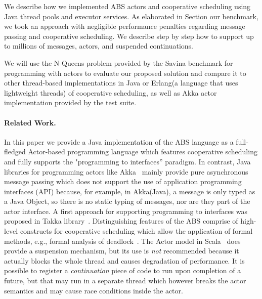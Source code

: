 We describe how we implemented ABS actors and cooperative scheduling using Java thread pools and executor services. 
As elaborated in Section our benchmark, we took an approach with negligible performance penalties regarding message passing and cooperative scheduling. 
We describe step by step how to support up to millions of messages, actors, and suspended continuations.


We will use the N-Queens problem provided by the Savina benchmark for programming with actors\cite{savina} to evaluate our proposed solution and compare it
to other thread-based implementations in Java or Erlang(a language that uses lightweight threads) of cooperative scheduling, as well as Akka actor implementation provided by the test suite.


\paragraph{Related Work.} 
In this paper we provide a Java implementation of the ABS language as a full-fledged Actor-based programming language which features cooperative scheduling and fully supports the "programming to interfaces'' paradigm. 
In contrast, Java libraries for programming actors like Akka~\cite{Akka} mainly provide pure asynchronous message passing which does not support the use of application programming interfaces (API) because, for example, in Akka(Java), a message is only typed as a Java Object, so there is no static typing of messages, nor are they part of the actor interface. A first approach for supporting programming to interfaces was proposed in Takka library~\cite{takka}. 
Distinguishing features of the ABS comprise of high-level constructs for cooperative scheduling which allow the application of formal methods, e.g.,
formal analysis of deadlock~\cite{deadlock}.
The Actor model in Scala~\cite{Scala} does provide a suspension mechanism, but its use is \emph{not} recommended because it actually blocks the whole thread and causes
degradation of performance.
It is possible to register a {\em continuation} piece of code to run upon completion of a future, but that may run in a separate thread which however breaks the actor semantics and may cause race conditions inside the actor.

